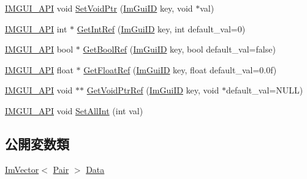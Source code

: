 \begin{DoxyCompactItemize}
\item 
\mbox{\hyperlink{imgui_8h_a43829975e84e45d1149597467a14bbf5}{I\+M\+G\+U\+I\+\_\+\+A\+PI}} void \mbox{\hyperlink{struct_im_gui_storage_a55f840086b3ec9cf63c67f02d159204a}{Set\+Void\+Ptr}} (\mbox{\hyperlink{imgui_8h_a1785c9b6f4e16406764a85f32582236f}{Im\+Gui\+ID}} key, void $\ast$val)
\item 
\mbox{\hyperlink{imgui_8h_a43829975e84e45d1149597467a14bbf5}{I\+M\+G\+U\+I\+\_\+\+A\+PI}} int $\ast$ \mbox{\hyperlink{struct_im_gui_storage_a28673fa7839263f3066ccb8e93e748a9}{Get\+Int\+Ref}} (\mbox{\hyperlink{imgui_8h_a1785c9b6f4e16406764a85f32582236f}{Im\+Gui\+ID}} key, int default\+\_\+val=0)
\item 
\mbox{\hyperlink{imgui_8h_a43829975e84e45d1149597467a14bbf5}{I\+M\+G\+U\+I\+\_\+\+A\+PI}} bool $\ast$ \mbox{\hyperlink{struct_im_gui_storage_aeb0d62100453d710bac5f6ad0a6e6a2e}{Get\+Bool\+Ref}} (\mbox{\hyperlink{imgui_8h_a1785c9b6f4e16406764a85f32582236f}{Im\+Gui\+ID}} key, bool default\+\_\+val=false)
\item 
\mbox{\hyperlink{imgui_8h_a43829975e84e45d1149597467a14bbf5}{I\+M\+G\+U\+I\+\_\+\+A\+PI}} float $\ast$ \mbox{\hyperlink{struct_im_gui_storage_a4b51cc8c92c65d4224af65a8ce7752ee}{Get\+Float\+Ref}} (\mbox{\hyperlink{imgui_8h_a1785c9b6f4e16406764a85f32582236f}{Im\+Gui\+ID}} key, float default\+\_\+val=0.\+0f)
\item 
\mbox{\hyperlink{imgui_8h_a43829975e84e45d1149597467a14bbf5}{I\+M\+G\+U\+I\+\_\+\+A\+PI}} void $\ast$$\ast$ \mbox{\hyperlink{struct_im_gui_storage_a2b203317f3f488818e9b9f416fe35332}{Get\+Void\+Ptr\+Ref}} (\mbox{\hyperlink{imgui_8h_a1785c9b6f4e16406764a85f32582236f}{Im\+Gui\+ID}} key, void $\ast$default\+\_\+val=N\+U\+LL)
\item 
\mbox{\hyperlink{imgui_8h_a43829975e84e45d1149597467a14bbf5}{I\+M\+G\+U\+I\+\_\+\+A\+PI}} void \mbox{\hyperlink{struct_im_gui_storage_ae5ee60618c4ce8e2b4ce0e5543d52992}{Set\+All\+Int}} (int val)
\end{DoxyCompactItemize}
\subsection*{公開変数類}
\begin{DoxyCompactItemize}
\item 
\mbox{\hyperlink{class_im_vector}{Im\+Vector}}$<$ \mbox{\hyperlink{struct_im_gui_storage_1_1_pair}{Pair}} $>$ \mbox{\hyperlink{struct_im_gui_storage_aab0b9789fac598a34c500459259fde42}{Data}}
\end{DoxyCompactItemize}


